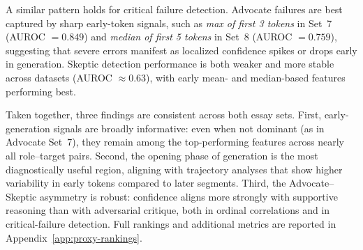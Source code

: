 \documentclass[11pt]{article}
\begin{document}
A similar pattern holds for critical failure detection. Advocate failures are best captured by sharp early-token signals, such as \emph{max of first 3 tokens} in Set~7 (AUROC $= 0.849$) and \emph{median of first 5 tokens} in Set~8 (AUROC $= 0.759$), suggesting that severe errors manifest as localized confidence spikes or drops early in generation. Skeptic detection performance is both weaker and more stable across datasets (AUROC $\approx 0.63$), with early mean- and median-based features performing best.

Taken together, three findings are consistent across both essay sets. First, early-generation signals are broadly informative: even when not dominant (as in Advocate Set~7), they remain among the top-performing features across nearly all role--target pairs. Second, the opening phase of generation is the most diagnostically useful region, aligning with trajectory analyses that show higher variability in early tokens compared to later segments. Third, the Advocate--Skeptic asymmetry is robust: confidence aligns more strongly with supportive reasoning than with adversarial critique, both in ordinal correlations and in critical-failure detection. Full rankings and additional metrics are reported in Appendix~\ref{app:proxy-rankings}.




\end{document}
